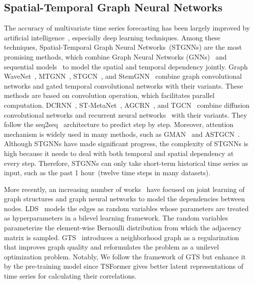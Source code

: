 \documentclass[sigconf]{acmart}
\begin{document}
\subsection{Spatial-Temporal Graph Neural Networks}
The accuracy of multivariate time series forecasting has been largely improved by artificial intelligence~\cite{Innovation}, especially deep learning techniques.
Among these techniques, Spatial-Temporal Graph Neural Networks~(STGNNs) are the most promising methods, 
which combine Graph Neural Networks (GNNs)~\cite{2017GCN, 2016ChebNet} and sequential models~\cite{2014GRU, 2014Seq2Seq} to model the spatial and temporal dependency jointly.
Graph WaveNet~\cite{GWNet}, MTGNN~\cite{2020MTGNN}, STGCN~\cite{2018STGCN}, and StemGNN~\cite{2020StemGNN} combine graph convolutional networks and gated temporal convolutional networks with their variants. These methods are based on convolution operation, which facilitates parallel computation.
DCRNN~\cite{2017DCRNN}, ST-MetaNet~\cite{2019STMetaNet}, AGCRN~\cite{2020AdaptiveGCRN}, and TGCN~\cite{2019TGCN} combine diffusion convolutional networks and recurrent neural networks~\cite{2014GRU, 2014Seq2Seq} with their variants. 
They follow the seq2seq~\cite{2014Seq2Seq} architecture to predict step by step.
Moreover, attention mechanism is widely used in many methods, such as GMAN~\cite{2020GMAN} and ASTGCN~\cite{2019ASTGCN}. 
Although STGNNs have made significant progress, the complexity of STGNNs is high because it needs to deal with both temporal and spatial dependency at every step.
Therefore, STGNNs can only take short-term historical time series as input, such as the past 1 hour~(twelve time steps in many datasets).

More recently, an increasing number of works~\cite{2018NRI, 2019LDS, 2021GTS} have focused on joint learning of graph structures and graph neural networks to model the dependencies between nodes.
LDS~\cite{2019LDS} models the edges as random variables whose parameters are treated as hyperparameters in a bilevel learning framework.
The random variables parameterize the element-wise Bernoulli distribution from which the adjacency matrix  is sampled.
GTS~\cite{2021GTS} introduces a neighborhood graph as a regularization that improves graph quality and reformulates the problem as a unilevel optimization problem.
Notably, We follow the framework of GTS but enhance it by the pre-training model since TSFormer gives better latent representations of time series for calculating their correlations.
\end{document}
